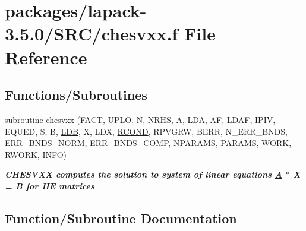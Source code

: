 \hypertarget{chesvxx_8f}{}\section{packages/lapack-\/3.5.0/\+S\+R\+C/chesvxx.f File Reference}
\label{chesvxx_8f}
\subsection*{Functions/\+Subroutines}
\begin{DoxyCompactItemize}
\item 
subroutine \hyperlink{chesvxx_8f_a362015bddbaafb0fe959ee14a9b9785b}{chesvxx} (\hyperlink{superlu__enum__consts_8h_af00a42ecad444bbda75cde1b64bd7e72a1b6692b56d378abb85bd49063721d034}{F\+A\+C\+T}, U\+P\+L\+O, \hyperlink{polmisc_8c_a0240ac851181b84ac374872dc5434ee4}{N}, \hyperlink{example__user_8c_aa0138da002ce2a90360df2f521eb3198}{N\+R\+H\+S}, \hyperlink{classA}{A}, \hyperlink{example__user_8c_ae946da542ce0db94dced19b2ecefd1aa}{L\+D\+A}, A\+F, L\+D\+A\+F, I\+P\+I\+V, E\+Q\+U\+E\+D, S, B, \hyperlink{example__user_8c_a50e90a7104df172b5a89a06c47fcca04}{L\+D\+B}, X, L\+D\+X, \hyperlink{superlu__enum__consts_8h_af00a42ecad444bbda75cde1b64bd7e72a9b5c151728d8512307565994c89919d5}{R\+C\+O\+N\+D}, R\+P\+V\+G\+R\+W, B\+E\+R\+R, N\+\_\+\+E\+R\+R\+\_\+\+B\+N\+D\+S, E\+R\+R\+\_\+\+B\+N\+D\+S\+\_\+\+N\+O\+R\+M, E\+R\+R\+\_\+\+B\+N\+D\+S\+\_\+\+C\+O\+M\+P, N\+P\+A\+R\+A\+M\+S, P\+A\+R\+A\+M\+S, W\+O\+R\+K, R\+W\+O\+R\+K, I\+N\+F\+O)
\begin{DoxyCompactList}\small\item\em {\bfseries  C\+H\+E\+S\+V\+X\+X computes the solution to system of linear equations \hyperlink{classA}{A} $\ast$ X = B for H\+E matrices} \end{DoxyCompactList}\end{DoxyCompactItemize}


\subsection{Function/\+Subroutine Documentation}
\hypertarget{chesvxx_8f_a362015bddbaafb0fe959ee14a9b9785b}{}
